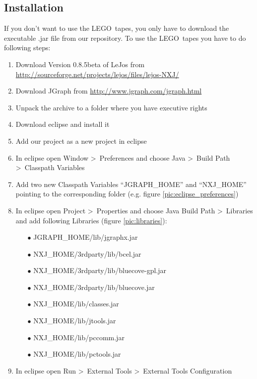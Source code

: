 \documentclass[%
  a4paper,%
  11pt,%
  blue,%
  hyperref	%
  ]{tubsartcl}
\begin{document}
\subsection{Installation}
\label{sec:installation}
If you don't want to use the LEGO\textregistered\, tapes, you only have to download the executable .jar file from our repository.
To use the LEGO\textregistered\, tapes you have to do following steps:
\begin{enumerate}
	\item Download Version 0.8.5beta of LeJos from \href{http://sourceforge.net/projects/lejos/files/lejos-NXJ/}{http://sourceforge.net/projects/lejos/files/lejos-NXJ/}
	\item Download JGraph from \href{http://www.jgraph.com/jgraph.html}{http://www.jgraph.com/jgraph.html}
	\item Unpack the archive to a folder where you have executive rights
	\item Download eclipse and install it
	\item Add our project as a new project in eclipse
	\item In eclipse open Window \textgreater\ Preferences and choose Java \textgreater\ Build Path \textgreater\ Classpath Variables
	\item Add two new Classpath Variables ``JGRAPH\_HOME'' and ``NXJ\_HOME'' pointing to the corresponding folder (e.g. figure \ref{pic:eclipse_preferences})
	\item In eclipse open Project \textgreater\ Properties and choose Java Build Path \textgreater\ Libraries and add following Libraries (figure \ref{pic:libraries}):
	\begin{enumerate}
	\item[$\bullet$] JGRAPH\_HOME/lib/jgraphx.jar
	\item[$\bullet$] NXJ\_HOME/3rdparty/lib/bcel.jar
	\item[$\bullet$] NXJ\_HOME/3rdparty/lib/bluecove-gpl.jar
	\item[$\bullet$] NXJ\_HOME/3rdparty/lib/bluecove.jar
	\item[$\bullet$] NXJ\_HOME/lib/classes.jar
	\item[$\bullet$] NXJ\_HOME/lib/jtools.jar
	\item[$\bullet$] NXJ\_HOME/lib/pccomm.jar
	\item[$\bullet$] NXJ\_HOME/lib/pctools.jar
	\end{enumerate}
	\item In eclipse open Run \textgreater\ External Tools \textgreater\ External Tools Configuration

\end{enumerate}
\end{document}

